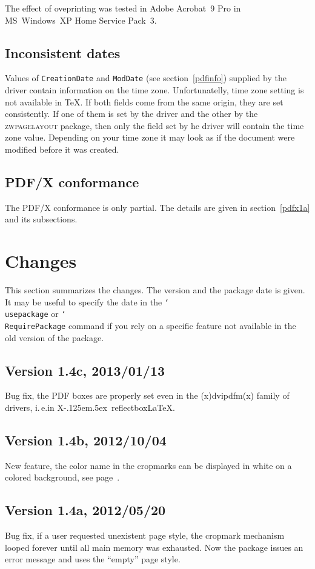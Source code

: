 \documentclass[11pt]{article}
\let\pkg\textsc
\DeclareRobustCommand\cmd[1]{\texttt{\char`\\#1}}
\DeclareRobustCommand\XeLaTeX{X\kern-.125em\lower.5ex\hbox{\csname
              reflectbox\endcsname{E}}\LaTeX}
\let\zwcomma\,
\def\,{\texorpdfstring{\zwcomma}{}}
\begin{document}
The effect of oveprinting was tested in Adobe Acrobat~9 Pro in MS~Windows~XP Home Service Pack~3.

\subsection{Inconsistent dates}
Values of \texttt{CreationDate} and \texttt{ModDate} (see section~\ref{pdfinfo}) supplied by the driver contain information on
the time zone. Unfortunatelly, time zone setting is not available in \TeX. If both fields come from
the same origin, they are set consistently. If one of them is set by the driver and the other by
the \pkg{zwpagelayout} package, then only the field set by he driver will contain the time zone
value. Depending on your time zone it may look as if the document were modified before it was
created.

\subsection{PDF/X conformance}
The PDF/X conformance is only partial. The details are given in section~\ref{pdfx1a} and its
subsections.

\section{Changes}
This section summarizes the changes. The version and the package date is given. It may be useful to
specify the date in the \cmd{usepackage} or \cmd{RequirePackage} command if you rely on a specific
feature not available in the old version of the package.

\subsection{Version 1.4c, 2013/01/13}
Bug fix, the PDF boxes are properly set even in the (x)dvipdfm(x) family of drivers, i.\,e.\@ in
\XeLaTeX.

\subsection{Version 1.4b, 2012/10/04}
New feature, the color name in the cropmarks can be displayed in white on a colored background, see
page~\pageref{color}.

\subsection{Version 1.4a, 2012/05/20}
Bug fix, if a user requested unexistent page style, the cropmark mechanism looped forever until all
main memory was exhausted. Now the package issues an error message and uses the ``empty'' page
style.
\end{document}

